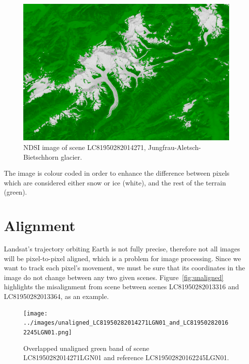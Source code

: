 \documentclass[12pt, a4paper]{report}
\begin{document}
	\begin{figure}[h!]
	\centering
	\includegraphics[width=\linewidth]{../images/LC81950282014271_ndsi.png}
	\caption{NDSI image of scene LC81950282014271, Jungfrau-Aletsch-Bietschhorn glacier.}
	\label{fig:ndsi}
	\end{figure}

	\par The image is colour coded in order to enhance the difference between pixels which are considered either snow or ice (white), and the rest of the terrain (green).


	\section{Alignment}
	\label{seq:alignment_functional}
	
	\par Landsat's trajectory orbiting Earth is not fully precise, therefore not all images will be pixel-to-pixel aligned, which is a problem for image processing. Since we want to track each pixel's movement, we must be sure that its coordinates in the image do not change between any two given scenes. Figure~\ref{fig:unaligned} highlights the misalignment from scene between scenes LC81950282013316 and LC81950282013364, as an example.
	
	\begin{figure}[h!]
	\centering
	\centering
	\texttt{[image: ../images/unaligned\_LC81950282014271LGN01\_and\_LC819502820162245LGN01.png]}
	\caption{Overlapped unaligned green band of scene LC81950282014271LGN01 and reference LC819502820162245LGN01.}
	\label{fig:scene_unaligned}	
	\end{figure}
\end{document}
